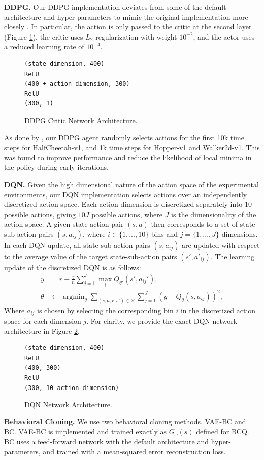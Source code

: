 \documentclass{article}
\newcommand{\y}{\gamma}
\newcommand{\ta}{\theta}
\newcommand{\w}{\omega}
\newcommand{\lp}{\left (}
\newcommand{\rp}{\right )}
\newcommand{\B}{\mathcal{B}}
\DeclareMathOperator*{\argmin}{argmin}
\begin{document}
\textbf{DDPG.} Our DDPG implementation deviates from some of the default architecture and hyper-parameters to mimic the original implementation more closely \citep{DDPG}. In particular, the action is only passed to the critic at the second layer (Figure \ref{fig:DDPG_arch}), the critic uses $L_2$ regularization with weight $10^{-2}$, and the actor uses a reduced learning rate of $10^{-4}$. 
\begin{figure}[ht]
\centering
\begin{BVerbatim}
(state dimension, 400)
ReLU
(400 + action dimension, 300)
RelU
(300, 1)
\end{BVerbatim}
\caption{DDPG Critic Network Architecture.} \label{fig:DDPG_arch}
\end{figure}

As done by \citet{fujimoto2018addressing}, our DDPG agent randomly selects actions for the first 10k time steps for HalfCheetah-v1, and 1k time steps for Hopper-v1 and Walker2d-v1. This was found to improve performance and reduce the likelihood of local minima in the policy during early iterations.

\textbf{DQN.} Given the high dimensional nature of the action space of the experimental environments, our DQN implementation selects actions over an independently discretized action space. Each action dimension is discretized separately into $10$ possible actions, giving $10J$ possible actions, where $J$ is the dimensionality of the action-space. A given state-action pair $(s,a)$ then corresponds to a set of state-sub-action pairs $(s,a_{ij})$, where $i \in \{1,...,10\}$ bins and $j=\{1,...,J\}$ dimensions. In each DQN update, all state-sub-action pairs $(s,a_{ij})$ are updated with respect to the average value of the target state-sub-action pairs $(s', a'_{ij})$. The learning update of the discretized DQN is as follows:
\begin{align} %
y &= r + \frac{\y}{n} \sum_{j=1}^J \max_{i} Q_{\ta'}(s',a_{ij}'), \\
\ta &\leftarrow \argmin_\ta \sum_{(s,a,r,s') \in \B} \sum_{j=1}^J \lp y - Q_\ta(s,a_{ij}) \rp^2,
\end{align}
Where $a_{ij}$ is chosen by selecting the corresponding bin $i$ in the discretized action space for each dimension $j$. For clarity, we provide the exact DQN network architecture in Figure \ref{fig:DQN_arch}.
\begin{figure}[ht]
\centering
\begin{BVerbatim}
(state dimension, 400)
ReLU
(400, 300)
RelU
(300, 10 action dimension)
\end{BVerbatim}
\caption{DQN Network Architecture.} \label{fig:DQN_arch}
\end{figure}

\textbf{Behavioral Cloning.} We use two behavioral cloning methods, VAE-BC and BC. VAE-BC is implemented and trained exactly as $G_\w(s)$ defined for BCQ. BC uses a feed-forward network with the default architecture and hyper-parameters, and trained with a mean-squared error reconstruction loss. 


% 
% 
\end{document}
